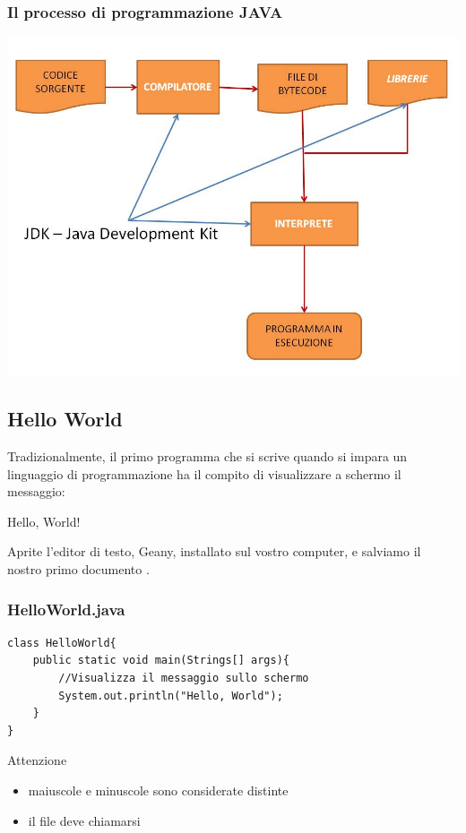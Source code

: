 \begin{frame}
\frametitle{Il processo di programmazione JAVA}
\begin{center}
\includegraphics[scale=0.4]{images/processo.jpg}
\end{center}
\end{frame}

\subsection{Hello World}
\begin{frame}
\begin{block}{}
Tradizionalmente, il primo programma che si scrive quando si impara un linguaggio di programmazione ha il compito di 
visualizzare a schermo il messaggio:
\begin{center}
\large{\alert{Hello, World!}}
\end{center}
\end{block}
\begin{block}{}
Aprite l'editor di testo, Geany, installato sul vostro computer, e salviamo il nostro primo documento
.
\end{block}
\end{frame}

\begin{frame}[fragile]
\frametitle{HelloWorld.java}
\begin{lstlisting}
class HelloWorld{
    public static void main(Strings[] args){
        //Visualizza il messaggio sullo schermo
        System.out.println("Hello, World");
    }
}
\end{lstlisting}
\begin{block}{Attenzione}
\begin{itemize}
\item maiuscole e minuscole sono considerate distinte
\item il file \alert{deve} chiamarsi 
\end{itemize}
\end{block}
\end{frame}

